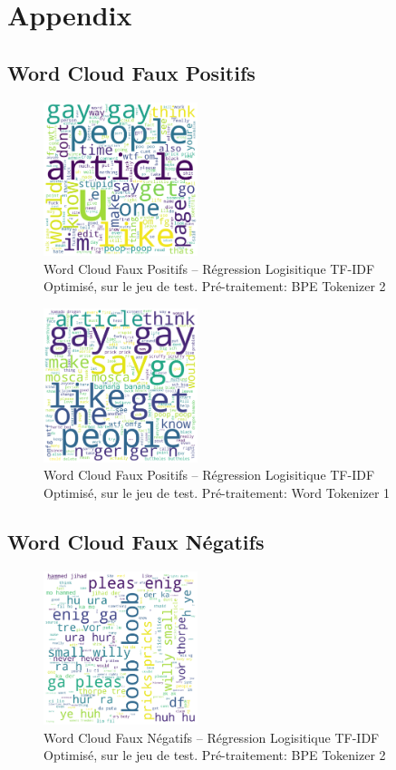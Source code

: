 \chapter{Appendix}
\label{chap:appendix_reg}

\section{Word Cloud Faux Positifs}
\begin{figure}[h]
    \centering
    \includegraphics[width=0.4\textwidth]{figures/word-cloud-reg-tf-fp.png}
    \caption{Word Cloud Faux Positifs – Régression Logisitique TF-IDF Optimisé, sur le jeu de test. Pré-traitement: BPE Tokenizer 2}
\end{figure}

\begin{figure}[h]
    \centering
    \includegraphics[width=0.4\textwidth]{figures/word-cloud-reg-w2v-fp.png}
    \caption{Word Cloud Faux Positifs – Régression Logisitique TF-IDF Optimisé, sur le jeu de test. Pré-traitement: Word Tokenizer 1}
\end{figure}

\newpage
\section{Word Cloud Faux Négatifs}
\begin{figure}[h]
    \centering
    \includegraphics[width=0.4\textwidth]{figures/word-cloud-reg-tf-fn.png}
    \caption{Word Cloud Faux Négatifs – Régression Logisitique TF-IDF Optimisé, sur le jeu de test. Pré-traitement: BPE Tokenizer 2}
\end{figure}


